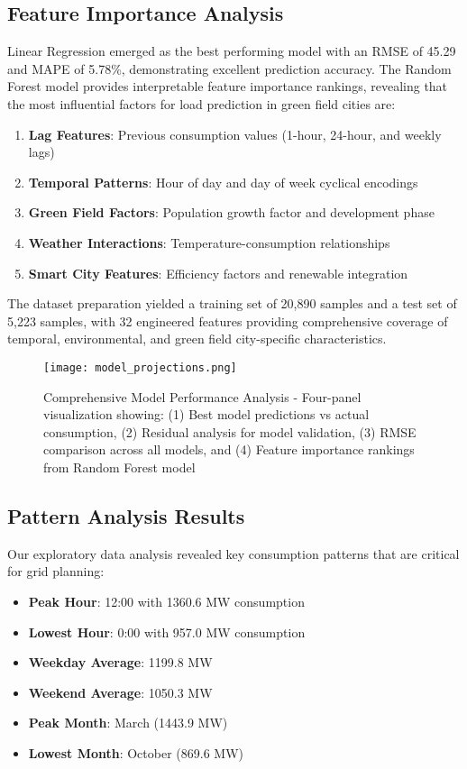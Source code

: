 \documentclass[12pt,a4paper]{article}
\begin{document}
\subsection{Feature Importance Analysis}
Linear Regression emerged as the best performing model with an RMSE of 45.29 and MAPE of 5.78\%, demonstrating excellent prediction accuracy. The Random Forest model provides interpretable feature importance rankings, revealing that the most influential factors for load prediction in green field cities are:

\begin{enumerate}
    \item \textbf{Lag Features}: Previous consumption values (1-hour, 24-hour, and weekly lags)
    \item \textbf{Temporal Patterns}: Hour of day and day of week cyclical encodings
    \item \textbf{Green Field Factors}: Population growth factor and development phase
    \item \textbf{Weather Interactions}: Temperature-consumption relationships
    \item \textbf{Smart City Features}: Efficiency factors and renewable integration
\end{enumerate}

The dataset preparation yielded a training set of 20,890 samples and a test set of 5,223 samples, with 32 engineered features providing comprehensive coverage of temporal, environmental, and green field city-specific characteristics.

\begin{figure}[H]
    \centering
    \texttt{[image: model\_projections.png]}
    \caption{Comprehensive Model Performance Analysis - Four-panel visualization showing: (1) Best model predictions vs actual consumption, (2) Residual analysis for model validation, (3) RMSE comparison across all models, and (4) Feature importance rankings from Random Forest model}
    \label{fig:model_projections}
\end{figure}

\subsection{Pattern Analysis Results}
Our exploratory data analysis revealed key consumption patterns that are critical for grid planning:

\begin{itemize}
    \item \textbf{Peak Hour}: 12:00 with 1360.6 MW consumption
    \item \textbf{Lowest Hour}: 0:00 with 957.0 MW consumption
    \item \textbf{Weekday Average}: 1199.8 MW
    \item \textbf{Weekend Average}: 1050.3 MW
    \item \textbf{Peak Month}: March (1443.9 MW)
    \item \textbf{Lowest Month}: October (869.6 MW)
\end{itemize}
\end{document}

